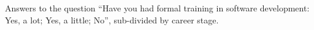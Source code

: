 \label{fig:train1}

Answers to the question ``Have you had formal training in software development: Yes, a lot; Yes, a little; No'', sub-divided by career stage.
  